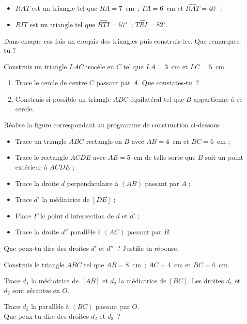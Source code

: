 \begin{exercice}
\begin{itemize}
 \item $RAT$ est un triangle tel que $RA = 7$ cm ; $TA = 6$ cm et $\widehat{RAT} = 40^\circ$ ;
 \item $RIT$ est un triangle tel que $\widehat{RTI} = 57^\circ$ ; $\widehat{TRI} = 82^\circ$.
 \end{itemize}
Dans chaque cas fais un croquis des triangles puis construis-les. Que remarques-tu ? 
\end{exercice}


\begin{exercice}
Construis un triangle $LAC$ isocèle en $C$ tel que $LA = 3$ cm et $LC = 5$ cm.
\begin{enumerate}
 \item Trace le cercle de centre $C$ passant par $A$. Que constates‑tu ?
 \item Construis si possible un triangle $ABC$ équilatéral tel que $B$ appartienne à ce cercle.
 \end{enumerate}
\end{exercice}


\begin{exercice}
Réalise la figure correspondant au programme de construction ci‑dessous :
\begin{itemize}
 \item Trace un triangle $ABC$ rectangle en $B$ avec $AB = 4$ cm et $BC = 6$ cm ;
 \item Trace le rectangle $ACDE$ avec $AE = 5$ cm de telle sorte que $B$ soit un point extérieur à $ACDE$ ;
 \item Trace la droite $d$ perpendiculaire à $(AB)$ passant par $A$ ;
 \item Trace $d'$ la médiatrice de $[DE]$ ;
 \item Place $F$ le point d'intersection de $d$ et $d'$ ;
 \item Trace la droite $d''$ parallèle à $(AC)$ passant par $B$.
 \end{itemize}
Que peux‑tu dire des droites $d'$ et $d''$ ? Justifie ta réponse.
\end{exercice}


\begin{exercice}
Construis le triangle $ABC$ tel que $AB = 8$ cm ; $AC = 4$ cm et $BC = 6$ cm.

Trace $d_1$ la médiatrice de $[AB]$ et $d_2$ la médiatrice de $[BC]$. Les droites $d_1$ et $d_2$ sont sécantes en $O$.

Trace $d_3$ la parallèle à $(BC)$ passant par $O$. \\[0.5em]
Que peux‑tu dire des droites $d_2$ et $d_3$ ?
\end{exercice}


